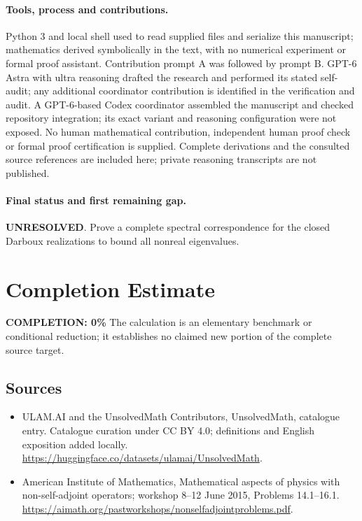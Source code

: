 \documentclass[11pt]{article}
\begin{document}
\paragraph{Tools, process and contributions.}
Python 3 and local shell used to read supplied files and serialize this manuscript; mathematics derived symbolically in the text, with no numerical experiment or formal proof assistant. Contribution prompt A was followed by prompt B. GPT-6 Astra with ultra reasoning drafted the research and performed its stated self-audit; any additional coordinator contribution is identified in the verification and audit. A GPT-6-based Codex coordinator assembled the manuscript and checked repository integration; its exact variant and reasoning configuration were not exposed. No human mathematical contribution, independent human proof check or formal proof certification is supplied. Complete derivations and the consulted source references are included here; private reasoning transcripts are not published.

\paragraph{Final status and first remaining gap.}
\textbf{UNRESOLVED}. Prove a complete spectral correspondence for the closed Darboux realizations to bound all nonreal eigenvalues.

\section{Completion Estimate}
\noindent\textbf{COMPLETION: 0\%}
The calculation is an elementary benchmark or conditional reduction; it establishes no claimed new portion of the complete source target.

\subsection{Sources}
\begin{itemize}
\item[\hypertarget{source:statement:1}{S1}] ULAM.AI and the UnsolvedMath Contributors, UnsolvedMath, catalogue entry. Catalogue curation under CC BY 4.0; definitions and English exposition added locally.
\url{https://huggingface.co/datasets/ulamai/UnsolvedMath}.
\item[\hypertarget{source:statement:2}{S2}] American Institute of Mathematics, Mathematical aspects of physics with non-self-adjoint operators; workshop 8–12 June 2015, Problems 14.1–16.1.
\url{https://aimath.org/pastworkshops/nonselfadjointproblems.pdf}.
\end{itemize}
\label{end:statement}
\end{document}
